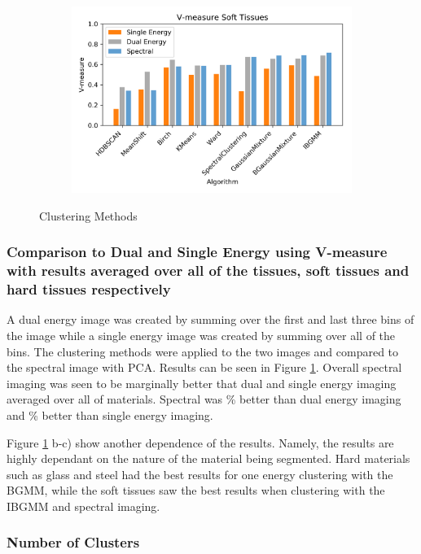 \documentclass[a4paper,11pt]{article}
\begin{document}
\begin{figure}[b!]
\begin{subfigure}[b]{0.32\textwidth}
    \end{subfigure}
    \begin{subfigure}[b]{0.32\textwidth}
        \includegraphics[width=\textwidth]{figures/soft.png}
    \end{subfigure}
    \caption{Clustering Methods}
    \label{results:hard_soft}
\end{figure}

\subsubsection{Comparison to Dual and Single Energy using V-measure with results averaged over all of the tissues, soft tissues and hard tissues respectively}

A dual energy image was created by summing over the first and last three bins of the image while a single energy image was created by summing over all of the bins. The clustering methods were applied to the two images and compared to the spectral image with PCA. Results can be seen in Figure \ref{results:hard_soft}. Overall spectral imaging was seen to be marginally better that dual and single energy imaging averaged over all of materials. Spectral was \% better than dual energy imaging and \% better than single energy imaging.

Figure \ref{results:hard_soft} b-c) show another dependence of the results. Namely, the results are highly dependant on the nature of the material being segmented. Hard materials such as glass and steel had the best results for one energy clustering with the BGMM, while the soft tissues saw the best results when clustering with the IBGMM and spectral imaging.

\subsubsection{Number of Clusters}
\end{document}
